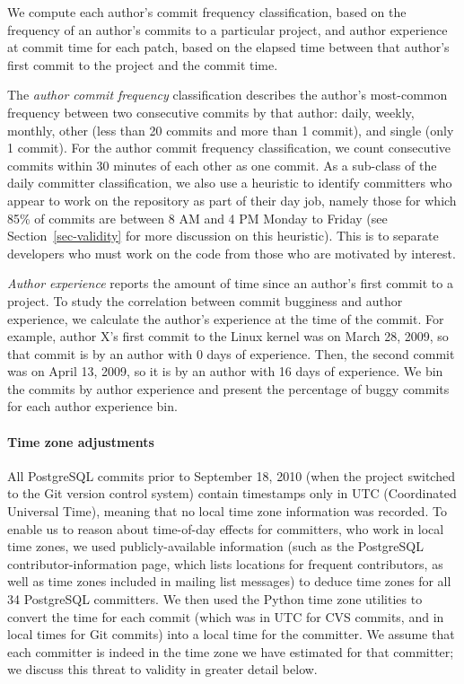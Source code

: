 We compute each author's commit frequency classification, based on the frequency of an
author's commits to a particular project, and author experience at commit time
for each patch, based on the elapsed time between that author's first commit to
the project and the commit time.

The {\em author commit frequency} classification describes the author's most-common
frequency between two consecutive commits by that author: daily, weekly, monthly, other (less than
20 commits and more than 1 commit), and single (only 1 commit). For the author commit frequency classification,
we count consecutive commits within 30 minutes of each other as one commit. As a
sub-class of the daily committer classification, we also use a heuristic to
identify committers who appear to work on the repository as part of their day
job, namely those for which 85\% of commits are between 8 AM and 4 PM Monday to
Friday (see Section~\ref{sec-validity} for more discussion on this heuristic). This is to separate developers who must work on the code from those who
are motivated by interest.

{\em Author experience} reports the amount of time since an author's first
commit to a project. To study the correlation between commit bugginess and
author experience, we calculate the author's experience at the time of the
commit. For example, author X's first commit to the Linux kernel was on March
28, 2009, so that commit is by an author with 0 days of experience. Then, the
second commit was on April 13, 2009, so it is by an author with 16 days of
experience. We bin the commits by author experience and present the percentage
of buggy commits for each author experience bin.
 
\paragraph{Time zone adjustments}

All PostgreSQL commits prior to September 18, 2010 (when the project switched to
the Git version control system) contain timestamps only in UTC (Coordinated
Universal Time), meaning that no local time zone information was recorded. To
enable us to reason about time-of-day effects for committers, who work in local
time zones, we used publicly-available information (such as the PostgreSQL
contributor-information page, which lists locations for frequent contributors,
as well as time zones included in mailing list messages) to deduce time zones
for all 34 PostgreSQL committers. We then used the Python time zone utilities to
convert the time for each commit (which was in UTC for CVS commits, and in local
times for Git commits) into a local time for the committer. We assume that each
committer is indeed in the time zone we have estimated for that committer; we
discuss this threat to validity in greater detail below.

